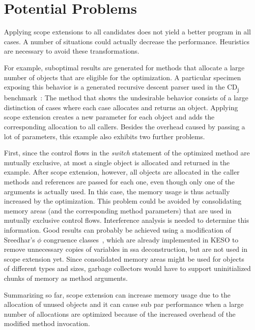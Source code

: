 	\section{Potential Problems}
		\label{sec:eea:probs}
		Applying scope extensions to all candidates does not yield a better program in all cases. A number of situations
		could actually decrease the performance. Heuristics are necessary to avoid these transformations.

		For example, suboptimal results are generated for methods that allocate a large number of objects that are eligible
		for the optimization. A particular specimen exposing this behavior is a generated recursive descent parser used in
		the CD\textsubscript{j} benchmark~\cite{kalibera:09:jtres}: The method that shows the undesirable behavior consists
		of a large distinction of cases where each case allocates and returns an object. Applying scope extension creates
		a new parameter for each object and adds the corresponding allocation to all callers. Besides the overhead caused by
		passing a lot of parameters, this example also exhibits two further problems.

		First, since the control flows in the \emph{switch} statement of the optimized method are mutually exclusive, at
		most a single object is allocated and returned in the example. After scope extension, however, all objects are
		allocated in the caller methods and references are passed for each one, even though only one of the arguments is
		actually used. In this case, the memory usage is thus actually increased by the optimization. This problem could be
		avoided by consolidating memory areas (and the corresponding method parameters) that are used in mutually exclusive
		control flows. Interference analysis is needed to determine this information. Good results can probably be achieved
		using a modification of Sreedhar's $\phi$ congruence classes~\cite{sreedhar:99:sas}, which are already implemented
		in KESO to remove unnecessary copies of variables in \gls{ssa} deconstruction, but are not used in scope extension
		yet. Since consolidated memory areas might be used for objects of different types and sizes, garbage collectors
		would have to support uninitialized chunks of memory as method arguments.

		Summarizing so far, scope extension can increase memory usage due to the allocation of unused objects and it can
		cause sub par performance when a large number of allocations are optimized because of the increased overhead of the
		modified method invocation.


